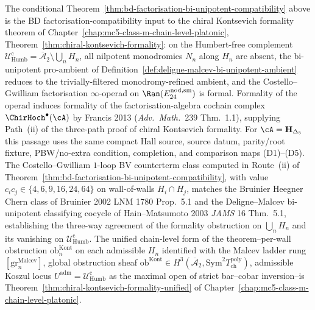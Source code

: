\begin{remark}
\label{rem:w213-feeds-chiral-kontsevich-formality}
%
%
The conditional
Theorem~\ref{thm:bd-factorisation-bi-unipotent-compatibility} above
is the BD factorisation-compatibility input to the chiral
Kontsevich formality theorem of
Chapter~\ref{chap:mc5-class-m-chain-level-platonic},
Theorem~\ref{thm:chiral-kontsevich-formality}: on the Humbert-free
complement
$\mathcal U_{\mathrm{Humb}}^{\mathrm{c}}=
\overline{\mathcal A}_2\setminus\bigcup_n H_n$, all nilpotent
monodromies $N_n$ along $H_n$ are absent, the bi-unipotent
pro-ambient of
Definition~\textup{\ref{def:deligne-malcev-bi-unipotent-ambient}}
reduces to the trivially-filtered monodromy-refined ambient, and
the Costello--Gwilliam factorisation $\infty$-operad on
$\Ran(E^{\mathrm{nod,sm}}_{24})$ is formal. Formality of the operad
induces formality of the factorisation-algebra cochain complex
$\ChirHoch^\bullet(\cA)$ by Francis 2013
(\textit{Adv.\ Math.}\ 239 Thm.~1.1), supplying Path~(ii) of the
three-path proof of chiral Kontsevich formality. For
$\cA=\mathbf H_{\Delta_5}$ this passage uses the same compact Hall
source, source datum, parity/root fixture, PBW/no-extra condition,
completion, and comparison maps \textup{(D1)--(D5)}. The
Costello--Gwilliam $1$-loop BV counterterm class computed in Route~(ii)
of Theorem~\ref{thm:bd-factorisation-bi-unipotent-compatibility}, with
value $c_ic_j\in\{4,6,9,16,24,64\}$ on wall-of-walls
$H_i\cap H_j$, matches the Bruinier Heegner Chern class of
Bruinier 2002 \textsc{LNM} 1780 Prop.~5.1 and the
Deligne--Malcev bi-unipotent classifying cocycle of
Hain--Matsumoto 2003 \textit{JAMS} 16 Thm.~5.1, establishing the
three-way agreement of the formality obstruction on $\bigcup_n H_n$
and its vanishing on $\mathcal U_{\mathrm{Humb}}^{\mathrm{c}}$. The
unified chain-level form of the theorem--per-wall obstruction
$\mathrm{ob}^{\mathrm{Kont}}_n$ on each admissible $H_n$ identified
with the Malcev ladder rung
$[\mathrm{gr}_n^{\mathrm{Malcev}}]$, global obstruction sheaf
$\mathrm{ob}^{\mathrm{Kont}}\in H^3(\overline{\mathcal A}_2,
\mathrm{Sym}^2 T^{\mathrm{poly}}_{\mathrm{ch}})$, admissible Koszul
locus $U^{\mathrm{adm}}=\mathcal U_{\mathrm{Humb}}^{\mathrm{c}}$ as
the maximal open of strict bar--cobar inversion--is
Theorem~\ref{thm:chiral-kontsevich-formality-unified} of
Chapter~\ref{chap:mc5-class-m-chain-level-platonic}.
\end{remark}
